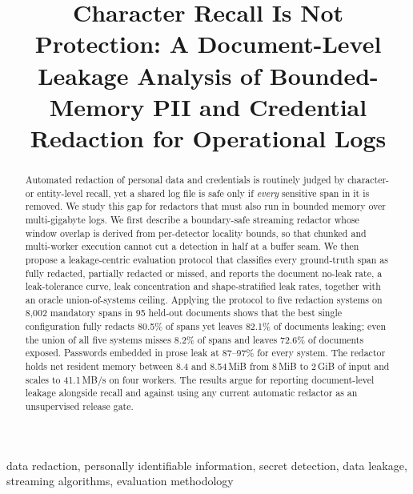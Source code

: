 \documentclass[conference]{IEEEtran}
\begin{document}
\title{Character Recall Is Not Protection: A Document-Level Leakage Analysis of Bounded-Memory PII and Credential Redaction for Operational Logs}

\author{
}

\maketitle

\begin{abstract}
Automated redaction of personal data and credentials is routinely judged by
character- or entity-level recall, yet a shared log file is safe only if
\emph{every} sensitive span in it is removed. We study this gap for
redactors that must also run in bounded memory over multi-gigabyte logs. We
first describe a boundary-safe streaming redactor whose window overlap is
derived from per-detector locality bounds, so that chunked and multi-worker
execution cannot cut a detection in half at a buffer seam. We then propose a
leakage-centric evaluation protocol that classifies every ground-truth span as
fully redacted, partially redacted or missed, and reports the document
no-leak rate, a leak-tolerance curve, leak concentration and shape-stratified
leak rates, together with an oracle union-of-systems ceiling. Applying the
protocol to five redaction systems on 8{,}002 mandatory spans in 95 held-out
documents shows that the best single configuration fully redacts 80.5\% of
spans yet leaves 82.1\% of documents leaking; even the union of all five
systems misses 8.2\% of spans and leaves 72.6\% of documents exposed.
Passwords embedded in prose leak at 87--97\% for every system. The redactor
holds net resident memory between 8.4 and 8.54\,MiB from 8\,MiB to 2\,GiB of
input and scales to 41.1\,MB/s on four workers. The results argue for
reporting document-level leakage alongside recall and against using any
current automatic redactor as an unsupervised release gate.
\end{abstract}

\begin{IEEEkeywords}
data redaction, personally identifiable information, secret detection, data leakage, streaming algorithms, evaluation methodology
\end{IEEEkeywords}
\end{document}
